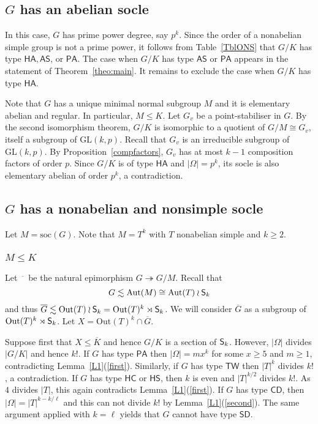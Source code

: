 \documentclass[twoside,12pt,leqno]{amsproc}
\numberwithin{table}{section}
\numberwithin{figure}{section}
\theoremstyle{plain}
\theoremstyle{definition}\newtheorem{definition}[theorem]{Definition}
\theoremstyle{definition}\newtheorem{example}[theorem]{Example}
\theoremstyle{definition}\newtheorem{construction}[theorem]{Construction}
\theoremstyle{definition}\newtheorem{remark}[theorem]{Remark}
\theoremstyle{definition}\newtheorem{problem}[theorem]{Problem}
\begin{document}
\subsection{$G$ has an abelian socle}

In this case, $G$ has prime power degree, say $p^k$. Since the order
of a nonabelian simple group is not a prime power, it
follows from Table~\ref{TblONS} that $G/K$ has type ${\mathsf{HA}}, {\mathsf{AS}}$, or
${\mathsf{PA}}$. The case when $G/K$ has type ${\mathsf{AS}}$ or ${\mathsf{PA}}$ appears in the statement of
Theorem~\ref{theo:main}. It remains to exclude the case when $G/K$ has
type ${\mathsf{HA}}$.

Note that $G$ has a unique minimal normal subgroup $M$ and it is
elementary abelian and regular. In particular, $M{\leqslant} K$. Let $G_v$ be
a point-stabiliser in $G$. By the second isomorphism theorem, $G/K$ is
isomorphic to a quotient of $G/M\cong G_v$, itself a subgroup of
${\mathrm{GL}}(k,p)$. Recall that $G_v$ is an irreducible subgroup of
${\mathrm{GL}}(k,p)$. By Proposition~\ref{compfactors}, $G_v$ has at most $k-1$
composition factors of order $p$. Since $G/K$ is of type ${\mathsf{HA}}$ and $|\Omega|=p^k$, its
socle is also elementary abelian of order $p^k$, a contradiction.

\subsection{$G$ has a nonabelian and nonsimple socle}
Let $M={{\mathrm{soc}}}(G)$. Note that $M=T^k$  with $T$ nonabelian simple and $k{\geqslant} 2$.

\subsubsection{$M{\leqslant} K$}
Let $\overline{\phantom{n}}$ be the natural epimorphism
$G\twoheadrightarrow G/M$. Recall that $$G\lesssim{\mathrm{Aut}}(M)\cong{\mathrm{Aut}}(T)
\wr {\textup{\textsf{S}}}_k$$ and thus $\overline{G}\lesssim{\mathrm{Out}}(T) \wr
{\textup{\textsf{S}}}_k={\mathrm{Out}}(T)^k \rtimes {\textup{\textsf{S}}}_k$. We will consider $\overline{G}$ as a
subgroup of ${\mathrm{Out}}(T)^k \rtimes {\textup{\textsf{S}}}_k$.  Let
$X={\mathrm{Out}}(T)^k\cap\overline{G}$.

Suppose first that $X{\leqslant}\overline{K}$ and hence $G/K$ is a section of
${\textup{\textsf{S}}}_k$. However, $|\Omega|$ divides $|G/K|$ and hence $k!$. If $G$
has type ${\mathsf{PA}}$ then $|\Omega|=mx^k$ for some $x{\geqslant} 5$ and $m{\geqslant} 1$,
contradicting Lemma~\ref{L1}(\ref{first}). Similarly, if $G$ has type
${\mathsf{TW}}$ then $|T|^k$ divides $k!$, a contradiction. If $G$ has type
${\mathsf{HC}}$ or ${\mathsf{HS}}$, then $k$ is even and $|T|^{k/2}$ divides $k!$. As
$4$ divides $|T|$, this again contradicts Lemma~\ref{L1}(\ref{first}).
If $G$ has type ${\mathsf{CD}}$, then $|\Omega|=|T|^{k-k/\ell}$ and this can not
divide $k!$ by Lemma~\ref{L1}(\ref{second}). The same argument applied
with $k=\ell$ yields that $G$ cannot have type ${\mathsf{SD}}$.
\end{document}
